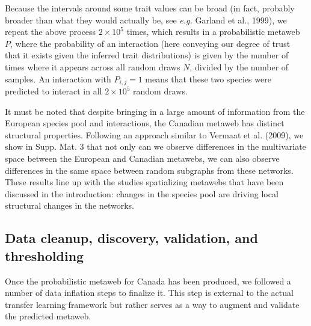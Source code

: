 \documentclass[11pt]{article}
\begin{document}
Because the intervals around some trait values can be broad (in fact,
probably broader than what they would actually be, see \emph{e.g.}
Garland et al., 1999), we repeat the above process \(2\times 10^5\)
times, which results in a probabilistic metaweb \(P\), where the
probability of an interaction (here conveying our degree of trust that
it exists given the inferred trait distributions) is given by the number
of times where it appears across all random draws \(N\), divided by the
number of samples. An interaction with \(P_{i,j} = 1\) means that these
two species were predicted to interact in all \(2\times 10^5\) random
draws.

It must be noted that despite bringing in a large amount of information
from the European species pool and interactions, the Canadian metaweb
has distinct structural properties. Following an approach similar to
Vermaat et al. (2009), we show in Supp. Mat. 3 that not only can we
observe differences in the multivariate space between the European and
Canadian metawebs, we can also observe differences in the same space
between random subgraphs from these networks. These results line up with
the studies spatializing metawebs that have been discussed in the
introduction: changes in the species pool are driving local structural
changes in the networks.

\hypertarget{data-cleanup-discovery-validation-and-thresholding}{%
\subsection{Data cleanup, discovery, validation, and
thresholding}\label{data-cleanup-discovery-validation-and-thresholding}}

Once the probabilistic metaweb for Canada has been produced, we followed
a number of data inflation steps to finalize it. This step is external
to the actual transfer learning framework but rather serves as a way to
augment and validate the predicted metaweb.
\end{document}
